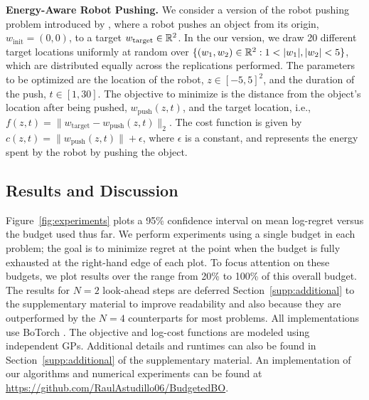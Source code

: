 \textbf{Energy-Aware Robot Pushing.} We consider a version of the robot pushing problem  introduced by \cite{wang2017max}, where a robot pushes an object from its origin, $w_{\mathrm{init}}=(0,0)$, to a target $w_{\mathrm{target}}\in\mathbb{R}^2$. In the our version, we draw 20 different target locations uniformly at random over $\{(w_1,w_2)\in\mathbb{R}^2: 1< |w_1|,|w_2| < 5\}$, which are distributed equally across the replications performed. The parameters to be optimized are the location of the robot, $z\in[-5,5]^2$, and the duration of the push, $t\in[1,30]$. The objective to minimize is the distance from the object's location after being pushed, $w_{\mathrm{push}}(z,t)$, and the target location, i.e., $f(z,t) = \|w_{\mathrm{target}} - w_{\mathrm{push}}(z,t)\|_2 $. The cost function is given by $c(z,t)= \|w_{\mathrm{push}}(z,t)\| + \epsilon$, where $\epsilon$ is a constant, and represents the energy spent by the robot by pushing the object.

\subsection{Results and Discussion}

Figure~\ref{fig:experiments}
plots a 95\% confidence interval on mean log-regret versus the budget used thus far. We perform experiments using a single budget in each problem; the goal 
is to minimize regret at the point when the budget is fully exhausted at the right-hand edge of each plot. To focus attention on  these budgets, we plot results over the range from 20\% to 100\% of this overall budget.
The results %
for $N=2$ look-ahead steps are deferred Section~\ref{supp:additional} to the supplementary material to improve readability and also because they are outperformed by the $N=4$ counterparts for most problems. 
All implementations use BoTorch \citep{balandat2020botorch}. The objective and  log-cost functions are modeled using independent GPs. Additional details and runtimes can also be found in Section~\ref{supp:additional} of the supplementary material. An implementation of our algorithms and numerical experiments can be found at \url{https://github.com/RaulAstudillo06/BudgetedBO}.


